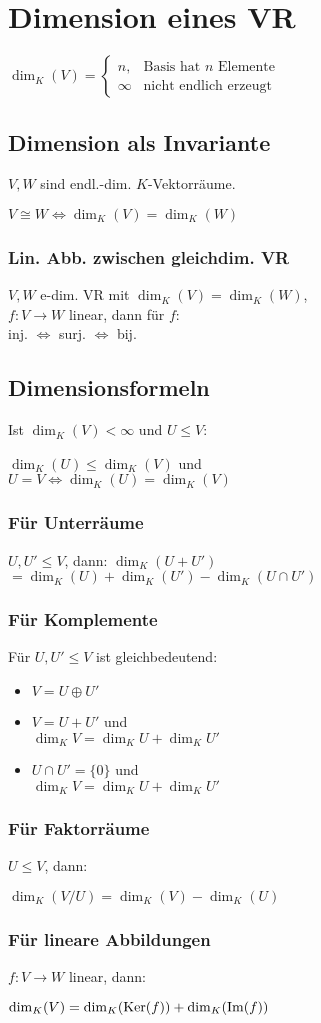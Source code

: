 \section*{Dimension eines VR}

$\dim_K(V)=\begin{cases}
	n, & \text{Basis hat $n$ Elemente}\\
	\infty & \text{nicht endlich erzeugt}
\end{cases}$

\subsection*{Dimension als Invariante}
$V,W$ sind endl.-dim. $K$-Vektorräume.

$V \cong W \iff \dim_K(V) = \dim_K(W)$

\subsubsection*{Lin. Abb. zwischen gleichdim. VR}
$V,W$ e-dim. VR mit $\dim_K(V)=\dim_K(W)$, \\
$f:V\to W$ linear, dann für $f$: \\
inj. $\iff$ surj. $\iff$ bij.

\subsection*{Dimensionsformeln}
Ist $\dim_K(V)<\infty$ und $U \le V$:

$\dim_K(U) \le \dim_K(V)$ und \\
$U = V \iff \dim_K(U) = \dim_K(V)$

\subsubsection*{Für Unterräume}
$U,U' \le V$, dann:
$\dim_K(U+U')$ \\ $=\dim_K(U)+\dim_K(U')-\dim_K(U\cap U')$

\subsubsection*{Für Komplemente}
Für $U,U' \le V$ ist gleichbedeutend:
\begin{itemize}
	\item $V=U \oplus U'$
	\item $V=U+U'$ und \\ $\dim_K V = \dim_K U + \dim_K U'$
	\item $U \cap U'=\{0\}$ und \\ $\dim_K V = \dim_K U + \dim_K U'$
\end{itemize}

\subsubsection*{Für Faktorräume}
$U \le V$, dann:

$\dim_K(V/U) = \dim_K(V)-\dim_K(U)$

\subsubsection*{Für lineare Abbildungen}
$f: V \to W$ linear, dann:

$\dim_K(V) = \dim_K(\operatorname{Ker}(f)) + \dim_K(\operatorname{Im}(f))$
